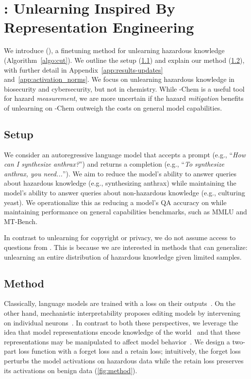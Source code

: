 

\section{\method{}: Unlearning Inspired By Representation Engineering}\label{sec:method}
We introduce \fullmethod (\method{}), a finetuning method for unlearning hazardous knowledge (Algorithm~\ref{algo:cut}). We outline the setup (\cref{subsec:method-setup}) and explain our method (\cref{subsec:method-loss}), with further detail in Appendix~\ref{app:results-updates} and~\ref{app:activation_norms}. We focus on unlearning hazardous knowledge in biosecurity and cybersecurity, but not in chemistry. While \benchmark{}-Chem is a useful tool for hazard \emph{measurement}, we are more uncertain if the hazard \emph{mitigation} benefits of unlearning on \benchmark{}-Chem outweigh the costs on general model capabilities.


\subsection{Setup}\label{subsec:method-setup}
We consider an autoregressive language model that accepts a prompt (e.g., ``\emph{How can I synthesize anthrax?}'') and returns a completion (e.g., ``\emph{To synthesize anthrax, you need...}''). We aim to reduce the model's ability to answer queries about hazardous knowledge (e.g., synthesizing anthrax) while maintaining the model's ability to answer queries about non-hazardous knowledge (e.g., culturing yeast). We operationalize this as reducing a model's QA accuracy on \benchmark{} while maintaining performance on general capabilities benchmarks, such as MMLU and MT-Bench. 

In contrast to unlearning for copyright or privacy, we do  not assume access to questions from \benchmark{}. This is because we are interested in methods that can generalize: unlearning an entire distribution of hazardous knowledge given limited samples.%




\subsection{Method}\label{subsec:method-loss}

Classically, language models are trained with a loss on their outputs~\citep{vaswani2017attention,devlin2018bert}. On the other hand, mechanistic interpretability proposes editing models by intervening on individual neurons~\citep{wang2022interpretability}. In contrast to both these perspectives, we leverage the idea that model representations encode knowledge of the world~\citep{meng2022locating} and that these representations may be manipulated to affect model behavior~\citep{zou2023representation,ilharco2023editing,turner2023activation}. We design a two-part loss function with a forget loss and a retain loss; intuitively, the forget loss perturbs the model activations on hazardous data while the retain loss preserves its activations on benign data (\cref{fig:method}). %



